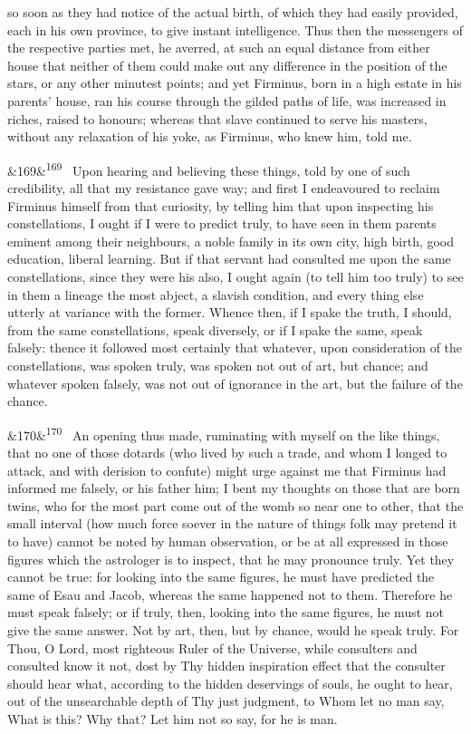 \documentclass[12pt]{article}
\newcommand{\para}[1][]{\par\noindent\ifx&#1&\else\textsuperscript{\footnotesize #1}~\fi}
\begin{document}
so soon as they had notice of the actual birth, of which they had easily provided, each in his own province, to give instant intelligence. Thus then the messengers of the respective parties met, he averred, at such an equal distance from either house that neither of them could make out any difference in the position of the stars, or any other minutest points; and yet Firminus, born in a high estate in his parents' house, ran his course through the gilded paths of life, was increased in riches, raised to honours; whereas that slave continued to serve his masters, without any relaxation of his yoke, as Firminus, who knew him, told me.

\para[169] Upon hearing and believing these things, told by one of such credibility, all that my resistance gave way; and first I endeavoured to reclaim Firminus himself from that curiosity, by telling him that upon inspecting his constellations, I ought if I were to predict truly, to have seen in them parents eminent among their neighbours, a noble family in its own city, high birth, good education, liberal learning. But if that servant had consulted me upon the same constellations, since they were his also, I ought again (to tell him too truly) to see in them a lineage the most abject, a slavish condition, and every thing else utterly at variance with the former. Whence then, if I spake the truth, I should, from the same constellations, speak diversely, or if I spake the same, speak falsely: thence it followed most certainly that whatever, upon consideration of the constellations, was spoken truly, was spoken not out of art, but chance; and whatever spoken falsely, was not out of ignorance in the art, but the failure of the chance.

\para[170] An opening thus made, ruminating with myself on the like things, that no one of those dotards (who lived by such a trade, and whom I longed to attack, and with derision to confute) might urge against me that Firminus had informed me falsely, or his father him; I bent my thoughts on those that are born twins, who for the most part come out of the womb so near one to other, that the small interval (how much force soever in the nature of things folk may pretend it to have) cannot be noted by human observation, or be at all expressed in those figures which the astrologer is to inspect, that he may pronounce truly. Yet they cannot be true: for looking into the same figures, he must have predicted the same of Esau and Jacob, whereas the same happened not to them. Therefore he must speak falsely; or if truly, then, looking into the same figures, he must not give the same answer. Not by art, then, but by chance, would he speak truly. For Thou, O Lord, most righteous Ruler of the Universe, while consulters and consulted know it not, dost by Thy hidden inspiration effect that the consulter should hear what, according to the hidden deservings of souls, he ought to hear, out of the unsearchable depth of Thy just judgment, to Whom let no man say, What is this? Why that? Let him not so say, for he is man.
\end{document}
